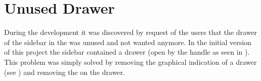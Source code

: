 
\section{Unused Drawer}
\label{sec:unused_drawer}

During the development it was discovered by request of the users that the drawer of the sidebar in the \launcher was unused and not wanted anymore. In the initial version of this project the sidebar contained a drawer (open by the handle as seen in ). This problem was simply solved by removing the graphical indication of a drawer (see ) and removing the  on the drawer. 